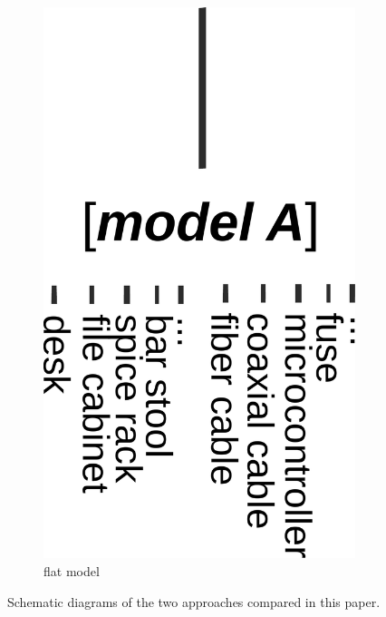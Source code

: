 \begin{figure}
\begin{subfigure}[t]{0.40\columnwidth}
        \includegraphics[width=\textwidth]{img/flat}
        \caption{flat model}
    \end{subfigure}
	\caption{
Schematic diagrams of the two approaches compared in this paper.
}
	\label{fig:approaches}
\end{figure}
